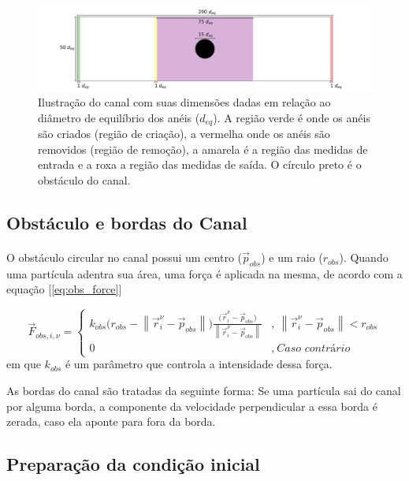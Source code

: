 \documentclass{article}
\theoremstyle{definition}
\newcommand\norm[1]{\left\lVert#1\right\rVert}
\def \quantity#1#2#3{\vec{#1}_{#2}^{#3}}
\def \pos#1#2{\quantity{r}{#1}{#2}}
\begin{document}
\begin{figure}[h]
    \centering
    \includegraphics[width=\linewidth]{figuras/channel_dims.png} 
    \caption{Ilustração do canal com suas dimensões dadas em relação ao diâmetro de equilíbrio dos anéis ($d_{eq}$). A região verde é onde os anéis são criados (região de criação), a vermelha onde os anéis são removidos (região de remoção), a amarela é a região das medidas de entrada e a roxa a região das medidas de saída. O círculo preto é o obstáculo do canal.}
    \label{fig:channel_view}
\end{figure}

\subsection{Obstáculo e bordas do Canal}
\paragraph{}
O obstáculo circular no canal possui um centro ($\vec p_{obs}$) e um raio ($r_{obs}$). Quando uma partícula adentra sua área, uma força é aplicada na mesma, de acordo com a equação [\ref{eq:obs_force}]

\begin{equation}
  \vec F_{obs, i, \nu} = \begin{cases}
      k_{obs} \big(r_{obs} - \norm{\pos{i}{\nu} - \vec p_{obs}} \big) \frac{\big( \pos{i}{\nu} - \vec p_{obs} \big)}{\norm{\pos{i}{\nu} - \vec p_{obs}}} &, ~ \norm{\pos{i}{\nu} - \vec p_{obs}} < r_{obs} \\
       0 &, ~\textit{Caso contrário}
  \end{cases}  
\label{eq:obs_force}
\end{equation}
em que $k_{obs}$ é um parâmetro que controla a intensidade dessa força.

As bordas do canal são tratadas da seguinte forma: Se uma partícula sai do canal por alguma borda, a componente da velocidade perpendicular a essa borda é zerada, caso ela aponte para fora da borda. 


\subsection{Preparação da condição inicial}
\end{document}
